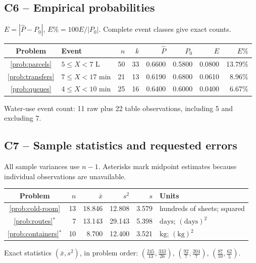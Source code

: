 \subsection*{C6 -- Empirical probabilities}
$E=|\widehat P-P_0|$, $E\%=100E/|P_0|$. Complete event classes give exact counts.
\begin{center}\begin{tabular}{clrrrrrr}
\toprule Problem&Event&$n$&$k$&$\widehat P$&$P_0$&$E$&$E\%$\\\midrule

\ref{prob:parcels}&$5\le X<7$ L&50&33&0.6600&0.5800&0.0800&13.79\%\\

\ref{prob:transfers}&$7\le X<17$ min&21&13&0.6190&0.6800&0.0610&8.96\%\\

\ref{prob:queues}&$4\le X<10$ min&25&16&0.6400&0.6000&0.0400&6.67\%\\

\bottomrule\end{tabular}\end{center}
Water-use event count: 11 raw plus 22 table observations, including 5 and excluding 7.
\clearpage\subsection*{C7 -- Sample statistics and requested errors}
All sample variances use $n-1$. Asterisks mark midpoint estimates because individual observations are unavailable.
\begin{center}\begin{tabular}{crrrrl}
\toprule Problem&$n$&$\bar x$&$s^2$&$s$&Units\\\midrule

\ref{prob:cold-room}&13&18.846&12.808&3.579&hundreds of sheets; squared\\

\ref{prob:routes}$^*$&7&13.143&29.143&5.398&$\mathrm{days}$; $(\mathrm{days})^2$\\

\ref{prob:containers}$^*$&10&8.700&12.400&3.521&$\mathrm{kg}$; $(\mathrm{kg})^2$\\

\bottomrule\end{tabular}\end{center}

Exact statistics $(\bar x,s^2)$, in problem order: $(\frac{245}{13},\frac{333}{26})$, $(\frac{92}{7},\frac{204}{7})$, $(\frac{87}{10},\frac{62}{5})$.


